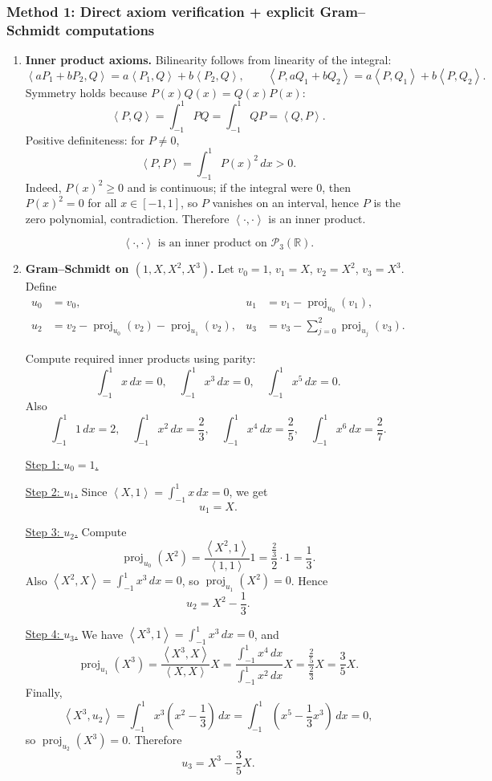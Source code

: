 \documentclass[12pt]{article}
\newcommand{\R}{\mathbb{R}}
\newcommand{\cP}{\mathcal{P}}
\DeclareMathOperator{\proj}{proj}
\newcommand{\ip}[2]{\left\langle #1,#2\right\rangle}
\begin{document}
\subsubsection{Method 1: Direct axiom verification + explicit Gram--Schmidt computations}
\begin{enumerate}[label=(\alph*)]
\item \textbf{Inner product axioms.}
Bilinearity follows from linearity of the integral:
\[
\ip{aP_1+bP_2}{Q}=a\ip{P_1}{Q}+b\ip{P_2}{Q},\qquad
\ip{P}{aQ_1+bQ_2}=a\ip{P}{Q_1}+b\ip{P}{Q_2}.
\]
Symmetry holds because $P(x)Q(x)=Q(x)P(x)$:
\[
\ip{P}{Q}=\int_{-1}^1 P Q=\int_{-1}^1 Q P=\ip{Q}{P}.
\]
Positive definiteness: for $P\neq 0$,
\[
\ip{P}{P}=\int_{-1}^1 P(x)^2\,dx>0.
\]
Indeed, $P(x)^2\ge 0$ and is continuous; if the integral were $0$, then $P(x)^2=0$ for all $x\in[-1,1]$, so $P$ vanishes on an interval,
hence $P$ is the zero polynomial, contradiction. Therefore $\ip{\cdot}{\cdot}$ is an inner product.

\[
\boxed{\,\ip{\cdot}{\cdot}\text{ is an inner product on }\cP_3(\R).\,}
\]

\item \textbf{Gram--Schmidt on $(1,X,X^2,X^3)$.}
Let $v_0=1$, $v_1=X$, $v_2=X^2$, $v_3=X^3$.
Define
\[
\begin{aligned}
u_0&=v_0, & u_1&=v_1-\proj_{u_0}(v_1),\\
u_2&=v_2-\proj_{u_0}(v_2)-\proj_{u_1}(v_2), &
u_3&=v_3-\sum_{j=0}^{2}\proj_{u_j}(v_3).
\end{aligned}
\]

Compute required inner products using parity:
\[
\int_{-1}^1 x\,dx=0,\quad \int_{-1}^1 x^3\,dx=0,\quad \int_{-1}^1 x^5\,dx=0.
\]
Also
\[
\int_{-1}^1 1\,dx=2,\quad \int_{-1}^1 x^2\,dx=\frac{2}{3},\quad \int_{-1}^1 x^4\,dx=\frac{2}{5},\quad \int_{-1}^1 x^6\,dx=\frac{2}{7}.
\]

\underline{Step 1: $u_0=1$.}

\underline{Step 2: $u_1$.}
Since $\ip{X}{1}=\int_{-1}^1 x\,dx=0$, we get
\[
u_1=X.
\]

\underline{Step 3: $u_2$.}
Compute
\[
\proj_{u_0}(X^2)=\frac{\ip{X^2}{1}}{\ip{1}{1}}1=\frac{\frac{2}{3}}{2}\cdot 1=\frac{1}{3}.
\]
Also $\ip{X^2}{X}=\int_{-1}^1 x^3\,dx=0$, so $\proj_{u_1}(X^2)=0$.
Hence
\[
u_2=X^2-\frac{1}{3}.
\]

\underline{Step 4: $u_3$.}
We have $\ip{X^3}{1}=\int_{-1}^1 x^3\,dx=0$, and
\[
\proj_{u_1}(X^3)=\frac{\ip{X^3}{X}}{\ip{X}{X}}X
=\frac{\int_{-1}^1 x^4\,dx}{\int_{-1}^1 x^2\,dx}X
=\frac{\frac{2}{5}}{\frac{2}{3}}X=\frac{3}{5}X.
\]
Finally,
\[
\ip{X^3}{u_2}=\int_{-1}^1 x^3\left(x^2-\frac13\right)\,dx
=\int_{-1}^1 \left(x^5-\frac13 x^3\right)\,dx=0,
\]
so $\proj_{u_2}(X^3)=0$. Therefore
\[
u_3=X^3-\frac{3}{5}X.
\]


\end{enumerate}
\end{document}
